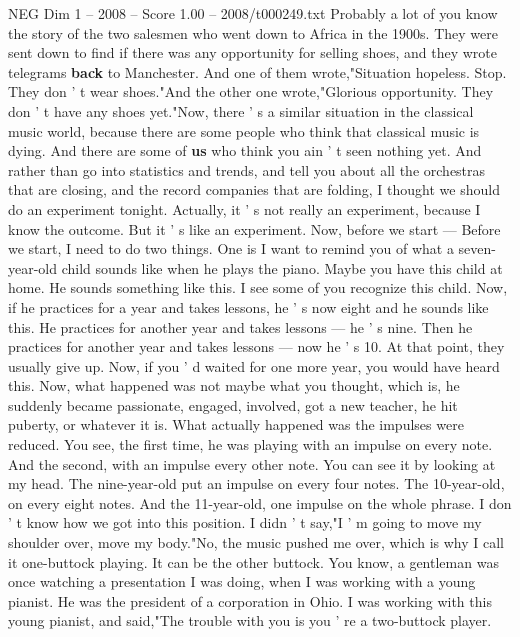 \begin{textsample}{NEG Dim 1 – 2008 – Score 1.00 – 2008/t000249.txt}  \label{ex:f1_neg_072}
Probably a lot of you know the story of the two salesmen who went down to Africa in the 1900s.
They were sent down to find if there was any opportunity for selling shoes, and they wrote telegrams \textbf{back} to Manchester.
And one of them wrote,"Situation hopeless.
Stop.
They don ' t wear shoes."And the other one wrote,"Glorious opportunity.
They don ' t have any shoes yet."Now, there ' s a similar situation in the classical music world, because there are some people who think that classical music is dying.
And there are some of \textbf{us} who think you ain ' t seen nothing yet.
And rather than go into statistics and trends, and tell you about all the orchestras that are closing, and the record companies that are folding, I thought we should do an experiment tonight.
Actually, it ' s not really an experiment, because I know the outcome.
But it ' s like an experiment.
Now, before we start — Before we start, I need to do two things.
One is I want to remind you of what a seven-year-old child sounds like when he plays the piano.
Maybe you have this child at home.
He sounds something like this.
I see some of you recognize this child.
Now, if he practices for a year and takes lessons, he ' s now eight and he sounds like this.
He practices for another year and takes lessons — he ' s nine.
Then he practices for another year and takes lessons — now he ' s 10.
At that point, they usually give up.
Now, if you ' d waited for one more year, you would have heard this.
Now, what happened was not maybe what you thought, which is, he suddenly became passionate, engaged, involved, got a new teacher, he hit puberty, or whatever it is.
What actually happened was the impulses were reduced.
You see, the first time, he was playing with an impulse on every note.
And the second, with an impulse every other note.
You can see it by looking at my head.
The nine-year-old put an impulse on every four notes.
The 10-year-old, on every eight notes.
And the 11-year-old, one impulse on the whole phrase.
I don ' t know how we got into this position.
I didn ' t say,"I ' m going to move my shoulder over, move my body."No, the music pushed me over, which is why I call it one-buttock playing.
It can be the other buttock.
You know, a gentleman was once watching a presentation I was doing, when I was working with a young pianist.
He was the president of a corporation in Ohio.
I was working with this young pianist, and said,"The trouble with you is you ' re a two-buttock player.

\end{textsample}
